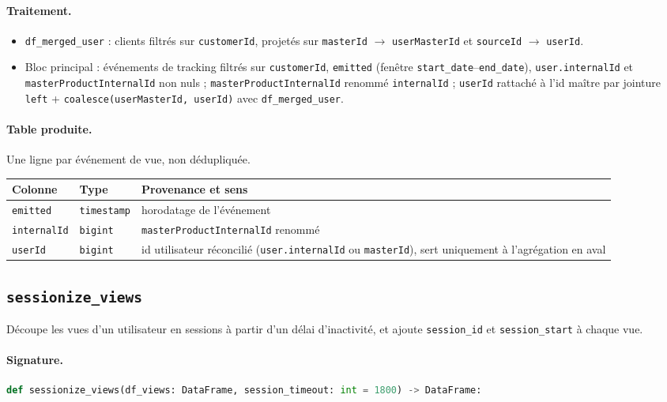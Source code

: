 \documentclass[11pt,a4paper]{article}
\newcommand{\code}[1]{\texttt{\small #1}}
\begin{document}
\paragraph{Traitement.}
\begin{itemize}[nosep,leftmargin=*]
  \item \code{df\_merged\_user} : clients filtrés sur \code{customerId},
        projetés sur \code{masterId} $\to$ \code{userMasterId} et
        \code{sourceId} $\to$ \code{userId}.
  \item Bloc principal : événements de tracking filtrés sur \code{customerId},
        \code{emitted} (fenêtre \code{start\_date}--\code{end\_date}),
        \code{user.internalId} et \code{masterProductInternalId} non nuls ;
        \code{masterProductInternalId} renommé \code{internalId} ; \code{userId}
        rattaché à l'id maître par jointure \code{left} +
        \code{coalesce(userMasterId, userId)} avec \code{df\_merged\_user}.
\end{itemize}

\paragraph{Table produite.}
Une ligne par événement de vue, non dédupliquée.
\begin{center}
\small
\begin{tabular}{@{}llp{6.8cm}@{}}
\toprule
\textbf{Colonne} & \textbf{Type} & \textbf{Provenance et sens} \\
\midrule
\code{emitted} & \code{timestamp} & horodatage de l'événement \\
\code{internalId} & \code{bigint} & \code{masterProductInternalId} renommé \\
\code{userId} & \code{bigint} & id utilisateur réconcilié (\code{user.internalId} ou \code{masterId}), sert uniquement à l'agrégation en aval \\
\bottomrule
\end{tabular}
\end{center}

\subsection{\texttt{sessionize\_views}}
\label{subsec:fn-sessionize-views}

Découpe les vues d'un utilisateur en sessions à partir d'un délai d'inactivité, et
ajoute \code{session\_id} et \code{session\_start} à chaque vue.

\paragraph{Signature.}\leavevmode\par
\begin{lstlisting}[language=Python]
def sessionize_views(df_views: DataFrame, session_timeout: int = 1800) -> DataFrame:
\end{lstlisting}
\end{document}
